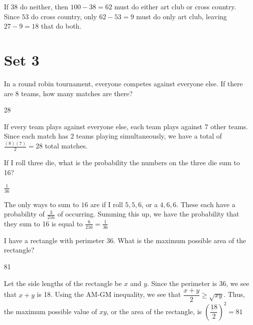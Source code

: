 \documentclass[11pt]{article}
\begin{document}
\begin{solution}
If 38 do neither, then $100-38=62$ must do either art club or cross country. Since $53$ do cross country, only $62-53=9$ must do only art club, leaving $27-9=\boxed{18}$ that do both.
\end{solution}

\newpage
\section*{Set 3}
\begin{problem}
In a round robin tournament, everyone competes against everyone else. If there are 8 teams, how many matches are there?
\end{problem}

\begin{answer}
28
\end{answer}

\begin{solution}
If every team plays against everyone else, each team plays against 7 other teams. Since each match has 2 teams playing simultaneously, we have a total of $\frac{(8)(7)}{2}=\boxed{28}$ total matches.
\end{solution}

\begin{problem}
If I roll three die, what is the probability the numbers on the three die sum to 16?
\end{problem}

\begin{answer}
$\frac{1}{36}$
\end{answer}

\begin{solution}
The only ways to sum to $16$ are if I roll $5, 5, 6$, or a $4, 6, 6$. These each have a probability of $\frac{3}{216}$ of occurring. Summing this up, we have the probability that they sum to 16 is equal to $\frac{6}{216} = \boxed{\frac{1}{36}}$
\end{solution}

\begin{problem}
I have a rectangle with perimeter 36. What is the maximum possible area of the rectangle?
\end{problem}

\begin{answer}
81
\end{answer}

\begin{solution}
Let the side lengths of the rectangle be $x$ and $y$. Since the perimeter is 36, we see that $x+y$ is 18. Using the AM-GM inequality, we see that $\dfrac{x+y}{2} \geq \sqrt{xy}$. Thus, the maximum possible value of $xy$, or the area of the rectangle, is $\left(\dfrac{18}{2}\right)^2=\boxed{81}$ 
\end{solution}
\end{document}
